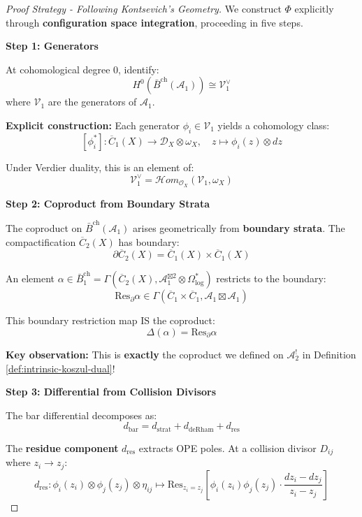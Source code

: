 \begin{proof}[Proof Strategy - Following Kontsevich's Geometry]

We construct $\Phi$ explicitly through \textbf{configuration space integration}, proceeding in five steps.

\medskip
\noindent\textbf{Step 1: Generators}

At cohomological degree 0, identify:
$$H^0(\bar{B}^{\text{ch}}(\mathcal{A}_1)) \cong \mathcal{V}_1^{\vee}$$
where $\mathcal{V}_1$ are the generators of $\mathcal{A}_1$.

\textbf{Explicit construction:} Each generator $\phi_i \in \mathcal{V}_1$ yields a cohomology class:
$$[\phi_i^*]: \overline{C}_1(X) \to \mathcal{D}_X \otimes \omega_X, \quad z \mapsto \phi_i(z) \otimes dz$$

Under Verdier duality, this is an element of:
$$\mathcal{V}_1^{\vee} = \mathcal{H}om_{\mathcal{O}_X}(\mathcal{V}_1, \omega_X)$$

\medskip
\noindent\textbf{Step 2: Coproduct from Boundary Strata}

The coproduct on $\bar{B}^{\text{ch}}(\mathcal{A}_1)$ arises geometrically from \textbf{boundary strata}. The compactification $\overline{C}_2(X)$ has boundary:
$$\partial \overline{C}_2(X) = \overline{C}_1(X) \times \overline{C}_1(X)$$

An element $\alpha \in \bar{B}_1^{\text{ch}} = \Gamma(\overline{C}_2(X), \mathcal{A}_1^{\boxtimes 2} \otimes \Omega^*_{\log})$ restricts to the boundary:
$$\text{Res}_{\partial} \alpha \in \Gamma(\overline{C}_1 \times \overline{C}_1, \mathcal{A}_1 \boxtimes \mathcal{A}_1)$$

This boundary restriction map IS the coproduct:
$$\Delta(\alpha) = \text{Res}_{\partial} \alpha$$

\textbf{Key observation:} This is \textbf{exactly} the coproduct we defined on $\mathcal{A}_2^!$ in Definition \ref{def:intrinsic-koszul-dual}!

\medskip
\noindent\textbf{Step 3: Differential from Collision Divisors}

The bar differential decomposes as:
$$d_{\text{bar}} = d_{\text{strat}} + d_{\text{deRham}} + d_{\text{res}}$$

The \textbf{residue component} $d_{\text{res}}$ extracts OPE poles. At a collision divisor $D_{ij}$ where $z_i \to z_j$:
$$d_{\text{res}}: \phi_i(z_i) \otimes \phi_j(z_j) \otimes \eta_{ij} \mapsto \text{Res}_{z_i=z_j}\left[\phi_i(z_i)\phi_j(z_j) \cdot \frac{dz_i - dz_j}{z_i - z_j}\right]$$


\end{proof}
